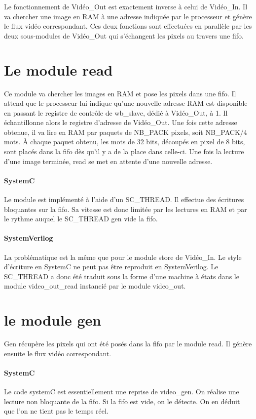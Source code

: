 \documentclass[a4paper,12pt]{report}
\begin{document}
{{	 Le fonctionnement de Vidéo\_Out est exactement inverse à celui de Vidéo\_In.
		Il va chercher une image en RAM à une adresse indiquée par le processeur
		et génère le flux vidéo correspondant.
		Ces deux fonctions sont effectuées en parallèle par les deux sous-modules de Vidéo\_Out qui s'échangent
		les pixels au travers une fifo.

		\section*{Le module read}
	 Ce module va chercher les images en RAM et pose les pixels dans une fifo.
		Il attend que le processeur lui indique qu'une nouvelle adresse RAM est disponible en passant le registre de contrôle de wb\_slave, dédié à Vidéo\_Out, à 1.
		Il échantillonne alors le registre d'adresse de Vidéo\_Out.
		Une fois cette adresse obtenue, il va lire en RAM par paquets de NB\_PACK pixels, soit NB\_PACK/4 mots.
		À chaque paquet obtenu, les mots de 32 bits, découpés en pixel de 8 bits, sont placés dans la fifo dès qu'il y a de la place dans celle-ci.
		Une fois la lecture d'une image terminée, read se met en attente d'une nouvelle adresse.

		\paragraph{SystemC}
	 Le module est implémenté à l'aide d'un SC\_THREAD.
		Il effectue des écritures bloquantes sur la fifo.
		Sa vitesse est donc limitée par les lectures en RAM et
		par le rythme auquel le SC\_THREAD gen vide la fifo.

		\paragraph{SystemVerilog}
	 La problématique est la même que pour le module store de Vidéo\_In.
		Le style d'écriture en SystemC ne peut pas être reproduit en SystemVerilog.
		Le SC\_THREAD a donc été traduit sous la forme d'une machine à états dans le module video\_out\_read instancié par le module video\_out.

		\section*{le module gen}
	 Gen récupère les pixels qui ont été posés dans la fifo par le module read.
		Il génère ensuite le flux vidéo correspondant.

		\paragraph{SystemC}
	 Le code systemC est essentiellement une reprise de video\_gen.
		On réalise une lecture non bloquante de la fifo.
		Si la fifo est vide, on le détecte.
		On en déduit que l'on ne tient pas le temps réel.

}}
\end{document}
